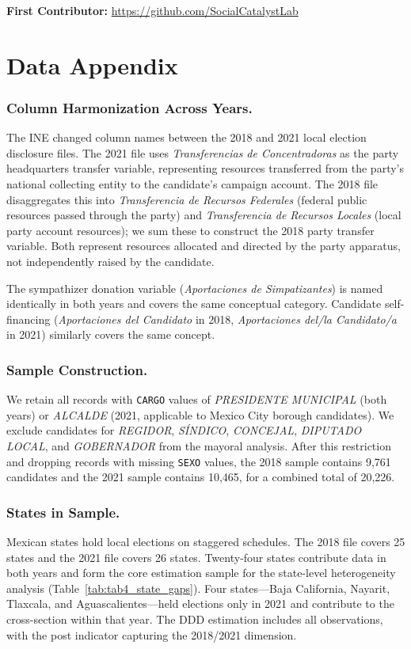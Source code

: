 \documentclass[12pt]{article}
\begin{document}
\noindent\textbf{First Contributor:} \url{https://github.com/SocialCatalystLab}

\label{apep_main_text_end}
\newpage


\newpage
\appendix

\section{Data Appendix}
\label{sec:data_appendix}

\subsubsection*{Column Harmonization Across Years.}
The INE changed column names between the 2018 and 2021 local election disclosure files. The 2021 file uses \textit{Transferencias de Concentradoras} as the party headquarters transfer variable, representing resources transferred from the party's national collecting entity to the candidate's campaign account. The 2018 file disaggregates this into \textit{Transferencia de Recursos Federales} (federal public resources passed through the party) and \textit{Transferencia de Recursos Locales} (local party account resources); we sum these to construct the 2018 party transfer variable. Both represent resources allocated and directed by the party apparatus, not independently raised by the candidate.

The sympathizer donation variable (\textit{Aportaciones de Simpatizantes}) is named identically in both years and covers the same conceptual category. Candidate self-financing (\textit{Aportaciones del Candidato} in 2018, \textit{Aportaciones del/la Candidato/a} in 2021) similarly covers the same concept.

\subsubsection*{Sample Construction.}
We retain all records with \texttt{CARGO} values of \textit{PRESIDENTE MUNICIPAL} (both years) or \textit{ALCALDE} (2021, applicable to Mexico City borough candidates). We exclude candidates for \textit{REGIDOR}, \textit{S\'INDICO}, \textit{CONCEJAL}, \textit{DIPUTADO LOCAL}, and \textit{GOBERNADOR} from the mayoral analysis. After this restriction and dropping records with missing \texttt{SEXO} values, the 2018 sample contains 9,761 candidates and the 2021 sample contains 10,465, for a combined total of 20,226.

\subsubsection*{States in Sample.}
Mexican states hold local elections on staggered schedules. The 2018 file covers 25 states and the 2021 file covers 26 states. Twenty-four states contribute data in both years and form the core estimation sample for the state-level heterogeneity analysis (Table~\ref{tab:tab4_state_gaps}). Four states---Baja California, Nayarit, Tlaxcala, and Aguascalientes---held elections only in 2021 and contribute to the cross-section within that year. The DDD estimation includes all observations, with the post indicator capturing the 2018/2021 dimension.
\end{document}
